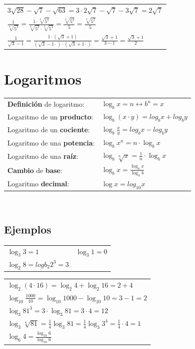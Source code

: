 \documentclass[a4paper,spanish,9pt]{extarticle}
\begin{document}
\begin{multicols*}{2}
\begin{tabular}{l}
$3\sqrt{28}-\sqrt{7}-\sqrt{63}=3\cdot 2\sqrt{7}-\sqrt{7}-3\sqrt{7}=2\sqrt{7}$ \\
$\frac{1}{\sqrt[6]{5^2}}=\frac{1\cdot \sqrt[6]{5^4}}{\sqrt[6]{5^2}\cdot \sqrt[6]{5^4}}=\frac{\sqrt[6]{5^4}}{5}=\frac{\sqrt[3]{5^2}}{5}$  \\
$\frac{1}{\sqrt{3}-1}=\frac{1 \cdot \left(\sqrt{3}+1\right)}{\left(\sqrt{3}-1 \cdot \right)\cdot \left(\sqrt{3}+1\cdot \right)}=\frac{\sqrt{3}+1}{3-1}=\frac{\sqrt{3}+1}{2}$
\end{tabular}

\section{Logaritmos}

\begin{tabular}{ll}
\textbf{Definición} de logaritmo: & $\log_b x = n \longleftrightarrow b^n=x$\\
Logaritmo de un \textbf{producto}: & $\log_b \left(x\cdot y\right)=log_b x + log_b y$\\
Logaritmo de un \textbf{cociente}: & $\log_b \frac{x}{y}=log_b x - log_b y$\\
Logaritmo de una \textbf{potencia}: & $\log_b {x^n} = n \cdot \log_b x$\\
Logaritmo de una \textbf{raíz}: & $\log_b {\sqrt[n]{x}} = \frac{1}{n} \cdot \log_b x$\\
\textbf{Cambio} de \textbf{base}: & $\log_b x =\frac{\log_a x}{\log_a b}$\\
Logaritmo \textbf{decimal}: & $\log x = log_{10} x$
\end{tabular}\\

\subsection{Ejemplos}

\begin{tabular}{ll}
$\log_3 3 = 1$ & $\log_3 1 = 0$ \\
$\log_2 8 = logb_2 2^3 = 3$  
\end{tabular}

\begin{tabular}{l}
$\log_2 \left(4\cdot 16\right)=\log_2 4 + \log_2 16=2 + 4$  \\
$\log_{10}\frac{1000}{10} =\log_{10} 1000 - \log_{10} 10 = 3-1=2 $ \\
$\log_3 {81^3} = 3 \cdot \log_3 81= 3 \cdot 4= 12$ \\
$\log_3 {\sqrt[4]{81}} = \frac{1}{4} \log_3 81=\frac{1}{4} \log_3 3^4= \frac{1}{4} \cdot 4= 1$ \\
$\log_6 4 =\frac{\log_{10} 6}{\log_{10} 6}$
\end{tabular}




\end{multicols*}
\end{document}
